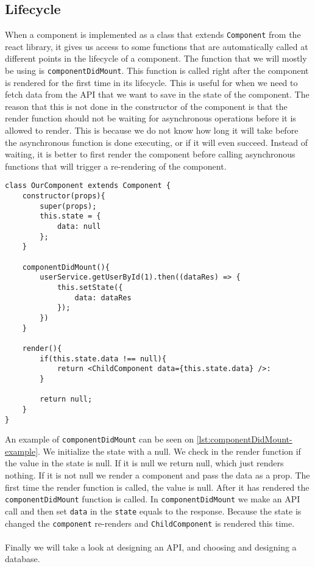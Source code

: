 \subsection*{Lifecycle}
When a component is implemented as a class that extends \texttt{Component} from the react library, it gives us access to some functions that are automatically called at different points in the lifecycle of a component.
The function that we will mostly be using is \texttt{componentDidMount}.
This function is called right after the component is rendered for the first time in its lifecycle.
This is useful for when we need to fetch data from the API that we want to save in the state of the component.
The reason that this is not done in the constructor of the component is that the render function should not be waiting for asynchronous operations before it is allowed to render.
This is because we do not know how long it will take before the asynchronous function is done executing, or if it will even succeed.
Instead of waiting, it is better to first render the component before calling asynchronous functions that will trigger a re-rendering of the component.
\begin{lstlisting}[caption={Example with the componentDidMount function}, label={lst:componentDidMount-example}]
class OurComponent extends Component {
	constructor(props){
		super(props);
		this.state = {
			data: null
		};
	}

	componentDidMount(){
		userService.getUserById(1).then((dataRes) => {
			this.setState({
				data: dataRes
			});
		})
	}

	render(){
		if(this.state.data !== null){
			return <ChildComponent data={this.state.data} />:
		}
			
		return null;
	}
}
\end{lstlisting}
An example of \texttt{componentDidMount} can be seen on \autoref{lst:componentDidMount-example}.
We initialize the state with a null.
We check in the render function if the value in the state is null.
If it is null we return null, which just renders nothing.
If it is not null we render a component and pass the data as a prop.
The first time the render function is called, the value is null.
After it has rendered the \texttt{componentDidMount} function is called.
In \texttt{componentDidMount} we make an API call and then set \texttt{data} in the \texttt{state} equals to the response.
Because the state is changed the \texttt{component} re-renders and \texttt{ChildComponent} is rendered this time.
\\\\
Finally we will take a look at designing an API, and choosing and designing a database.
